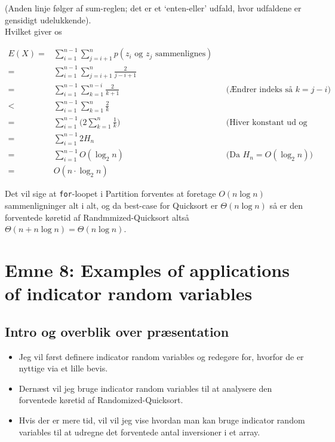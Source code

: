 \documentclass[12pt]{article}
\begin{document}
(Anden linje følger af sum-reglen; det er et `enten-eller' udfald, hvor udfaldene er gensidigt udelukkende). \\

Hvilket giver os

\begin{align*}
    E(X) =&  \sum_{i=1}^{n-1} \sum_{j=i+1}^n p(z_i \text{ og } z_j \text{ sammenlignes})  \\
    =& \sum_{i=1}^{n-1} \sum_{j=i+1}^n \frac{2}{j-i+1} \\
    =& \sum_{i=1}^{n-1} \sum_{k=1}^{n-i} \frac{2}{k+1} && \text{(Ændrer indeks så } k = j-i) \\
    <&  \sum_{i=1}^{n-1} \sum_{k=1}^n \frac{2}{k} \\
    =&  \sum_{i=1}^{n-1} \bigg( 2  \sum_{k=1}^n \frac{1}{k} \bigg) && \text{(Hiver konstant ud og inkluderer flere led)} \\
    =& \sum_{i=1}^{n-1} 2H_n \\
    =& \sum_{i=1}^{n-1} O(\log_2 n) && \text{(Da } H_n = O(\log_2 n))\\
    =& O(n \cdot \log_2 n)
\end{align*}

Det vil sige at \texttt{for}-loopet i Partition forventes at foretage $O(n \log n)$ sammenligninger alt i alt, og da best-case for Quicksort er $\Theta(n \log n)$ så er den forventede køretid af Randmmized-Quicksort altså $\Theta(n+n \log n)=\Theta(n \log n)$.

\newpage

\section{Emne 8: Examples of applications of indicator random variables}

\subsection*{Intro og overblik over præsentation}

\begin{itemize}
    \item Jeg vil først definere indicator random variables og redegøre for, hvorfor de er nyttige via et lille bevis.
    \item Dernæst vil jeg bruge indicator random variables til at analysere den forventede køretid af Randomized-Quicksort.
    \item Hvis der er mere tid, vil vil jeg vise hvordan man kan bruge indicator random variables til at udregne det forventede antal inversioner i et array. 
\end{itemize}
\end{document}
